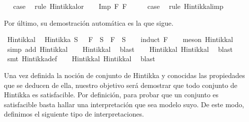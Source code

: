 \begin{isabellebody}
\ \isamarkupfalse%
\ {\isacharquery}case\ \isamarkupfalse%
\ {\isacharparenleft}rule\ Hintikka{\isacharunderscore}l{}{}{\isacharunderscore}or{\isacharparenright}\isanewline
{}\isamarkupfalse%
\isanewline
\ \ \isamarkupfalse%
\ {\isacharparenleft}Imp\ F{}\ F{}{\isacharparenright}\isanewline
\ \ \isamarkupfalse%
\ \isamarkupfalse%
\ {\isacharquery}case\ \isamarkupfalse%
\ {\isacharparenleft}rule\ Hintikka{\isacharunderscore}l{}{}{\isacharunderscore}imp{\isacharparenright}\isanewline
{}\isamarkupfalse%
%
\endisatagproof
{\isafoldproof}%
%
\isadelimproof
%
\endisadelimproof
%
\begin{isamarkuptext}%
Por último, su demostración automática es la que sigue.%
\end{isamarkuptext}\isamarkuptrue%
\isamarkupfalse%
\ Hintikka{\isacharunderscore}l{}{}{\isacharcolon}\ \isanewline
\ {\isachardoublequoteopen}Hintikka\ S\ {\isasymLongrightarrow}\ \isactrlbold {\isasymnot}\ F\ {\isasymin}\ S\ {\isasymlongrightarrow}\ F\ {\isasymnotin}\ S{\isachardoublequoteclose}\isanewline
%
\isadelimproof
\ \ %
\endisadelimproof
%
\isatagproof
{}\isamarkupfalse%
\ {\isacharparenleft}induct\ F{\isacharparenright}\isanewline
\ \ \isamarkupfalse%
\ {\isacharparenleft}meson\ Hintikka{\isacharunderscore}l{}{\isacharparenright}\isanewline
\ \ \isamarkupfalse%
\ {\isacharparenleft}simp\ add{\isacharcolon}\ Hintikka{\isacharunderscore}l{}{\isacharparenright}\isanewline
\ \ \isamarkupfalse%
\ Hintikka{\isacharunderscore}l{}\ \isamarkupfalse%
\ blast\isanewline
\ \ \isamarkupfalse%
\ Hintikka{\isacharunderscore}l{}\ Hintikka{\isacharunderscore}l{}\ \isamarkupfalse%
\ blast\isanewline
\ \ \isamarkupfalse%
\ {\isacharparenleft}smt\ Hintikka{\isacharunderscore}def{\isacharparenright}\isanewline
\ \ \isamarkupfalse%
\ Hintikka{\isacharunderscore}l{}\ Hintikka{\isacharunderscore}l{}\ \isamarkupfalse%
\ blast%
\endisatagproof
{\isafoldproof}%
%
\isadelimproof
%
\endisadelimproof
%
\isadelimdocument
%
\endisadelimdocument
%
\isatagdocument
%
\isamarkuptrue%
%
\endisatagdocument
{\isafolddocument}%
%
\isadelimdocument
%
\endisadelimdocument
%
\begin{isamarkuptext}%
Una vez definida la noción de conjunto de Hintikka y conocidas las
  propiedades que se deducen de ella, nuestro objetivo será demostrar
  que todo conjunto de Hintikka es satisfacible. Por definición, para 
  probar que un conjunto es satisfacible basta hallar una interpretación 
  que sea modelo suyo. De este modo, definimos el siguiente tipo de 
  interpretaciones.


\end{isamarkuptext}
\end{isabellebody}
